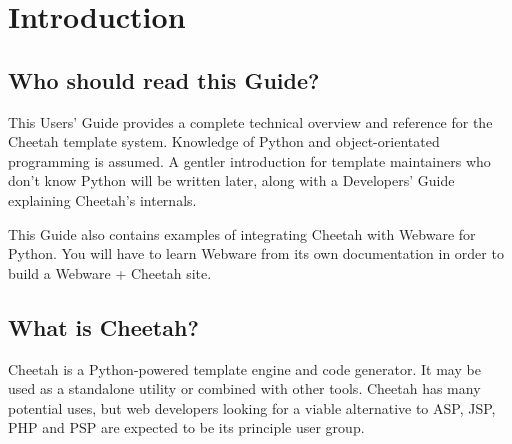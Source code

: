 \section{Introduction}
\label{intro}

\subsection{Who should read this Guide?}
\label{intro.whoShouldRead}

This Users' Guide provides a complete technical overview and reference for the
Cheetah template system.  Knowledge of Python and object-orientated programming
is assumed.  A gentler introduction for template maintainers who don't know
Python will be written later, along with a Developers' Guide explaining
Cheetah's internals.

This Guide also contains examples of integrating Cheetah with Webware for
Python.  You will have to learn Webware from its own documentation in order to
build a Webware + Cheetah site.

\subsection{What is Cheetah?}
\label{intro.whatIs}

Cheetah is a Python-powered template engine and code generator.  It may be used
as a standalone utility or combined with other tools.  Cheetah has
many potential uses, but web developers looking for a viable alternative to ASP,
JSP, PHP and PSP are expected to be its principle user group.

